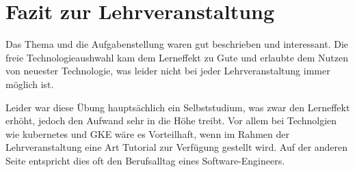 \section{Fazit zur Lehrveranstaltung}
Das Thema und die Aufgabenstellung waren gut beschrieben und interessant. Die freie Technologieaushwahl kam dem Lerneffekt zu Gute und erlaubte dem Nutzen von neuester
Technologie, was leider nicht bei jeder Lehrveranstaltung immer möglich ist.

Leider war diese Übung hauptsächlich ein Selbststudium, was zwar den Lerneffekt erhöht, jedoch den Aufwand sehr in die Höhe treibt.
Vor allem bei Technolgien wie kubernetes und GKE wäre es Vorteilhaft, wenn im Rahmen der Lehrveranstaltung eine Art Tutorial zur Verfügung gestellt wird.
Auf der anderen Seite entspricht dies oft den Berufsalltag eines Software-Engineers.
